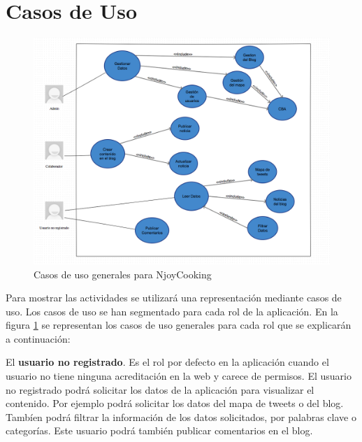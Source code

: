 \section{Casos de Uso}

\begin{landscape}
\begin{figure}
\begin{center}
\includegraphics[width=16cm]{imagenes/casos-de-uso.png}
\caption{Casos de uso generales para NjoyCooking}
\label{casos_uso}
\end{center}
\end{figure}
\end{landscape}

Para mostrar las actividades se utilizará una representación mediante casos de uso. Los casos de uso se han segmentado para cada rol de la aplicación. En la figura \ref{casos_uso}  se representan los casos de uso generales para cada rol que se explicarán a continuación:

\vspace{5 mm}

El \textbf{usuario no registrado}. Es el rol por defecto en la aplicación cuando el usuario no tiene ninguna acreditación en la web y carece de permisos. El usuario no registrado podrá solicitar los datos de la aplicación para visualizar el contenido. Por ejemplo podrá solicitar los datos del mapa de tweets o del blog. Tambíen podrá filtrar la información de los datos solicitados, por palabras clave o categorías. Este usuario podrá también publicar comentarios en el blog.

\vspace{5 mm}

